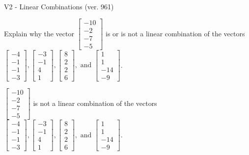 \begin{exercise}
  \begin{exerciseTitle}V2 - Linear Combinations (ver. 961)\end{exerciseTitle}
  \begin{exerciseStatement}
    Explain why the vector \(\left[\begin{array}{c}
-10 \\
-2 \\
-7 \\
-5
\end{array}\right]\)  is or is not a linear 
	combination of the vectors \(\left[\begin{array}{c}
-4 \\
-1 \\
-1 \\
-3
\end{array}\right] , \left[\begin{array}{c}
-3 \\
-1 \\
4 \\
1
\end{array}\right] , \left[\begin{array}{c}
8 \\
2 \\
2 \\
6
\end{array}\right] , \text{ and } \left[\begin{array}{c}
1 \\
1 \\
-14 \\
-9
\end{array}\right]\).
	


  \end{exerciseStatement}
  \begin{exerciseAnswer}
   \(\left[\begin{array}{c}
-10 \\
-2 \\
-7 \\
-5
\end{array}\right]\) 
  	 is not  
	a linear combination of the vectors \(\left[\begin{array}{c}
-4 \\
-1 \\
-1 \\
-3
\end{array}\right] , \left[\begin{array}{c}
-3 \\
-1 \\
4 \\
1
\end{array}\right] , \left[\begin{array}{c}
8 \\
2 \\
2 \\
6
\end{array}\right] , \text{ and } \left[\begin{array}{c}
1 \\
1 \\
-14 \\
-9
\end{array}\right]\).


\end{exerciseAnswer}
\end{exercise}
